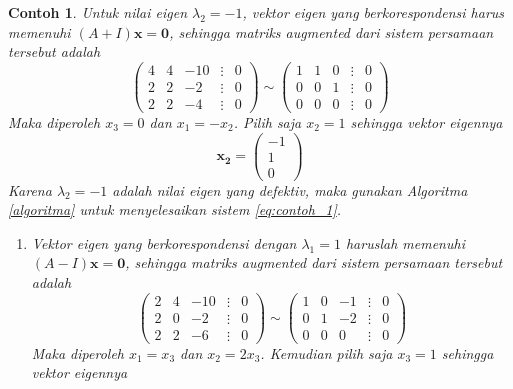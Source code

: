 \documentclass[a4paper]{article}
\theoremstyle{definisi}
\newtheorem{contoh}{Contoh}[section]
\numberwithin{equation}{section}
\begin{document}
\begin{contoh}
    Untuk nilai eigen $\lambda_2=-1$, vektor eigen yang berkorespondensi harus memenuhi $(A+I)\mathbf{x}=\mathbf{0}$, sehingga matriks \textit{augmented} dari sistem persamaan tersebut adalah
    \begin{equation*}
      \begin{pmatrix}
        4&4&-10&\vdots&0\\
        2&2&-2&\vdots&0\\
        2&2&-4&\vdots&0
      \end{pmatrix}\sim
      \begin{pmatrix}
        1&1&0&\vdots&0\\
        0&0&1&\vdots&0\\
        0&0&0&\vdots&0
      \end{pmatrix}
    \end{equation*}
    Maka diperoleh $x_3=0$ dan $x_1=-x_2$. Pilih saja $x_2=1$ sehingga vektor eigennya
    \begin{equation}
      \mathbf{x_2}=\begin{pmatrix}
        -1\\1\\0
      \end{pmatrix}
    \end{equation}
    Karena $\lambda_2=-1$ adalah nilai eigen yang \textit{defektiv}, maka gunakan Algoritma \ref{algoritma} untuk menyelesaikan sistem \eqref{eq:contoh_1}.
    \begin{enumerate}[label=Langkah \arabic*: ,leftmargin=*]
      \item Vektor eigen yang berkorespondensi dengan $\lambda_1=1$ haruslah memenuhi $(A-I)\mathbf{x}=\mathbf{0}$, sehingga matriks \textit{augmented} dari sistem persamaan tersebut adalah
      \begin{equation*}
        \begin{pmatrix}
          2&4&-10&\vdots&0\\
          2&0&-2&\vdots&0\\
          2&2&-6&\vdots&0
        \end{pmatrix}\sim
        \begin{pmatrix}
          1&0&-1&\vdots&0\\
          0&1&-2&\vdots&0\\
          0&0&0&\vdots&0
        \end{pmatrix}
      \end{equation*}
      Maka diperoleh $x_1=x_3$ dan $x_2=2x_3$. Kemudian pilih saja $x_3=1$ sehingga vektor eigennya

\end{enumerate}
\end{contoh}
\end{document}
